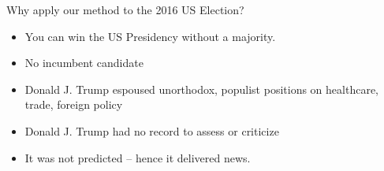 \documentclass[9pt]{beamer}
\theoremstyle{definition}
\begin{document}
    \begin{frame}{Why apply our method to the 2016 US Election?}
    
        \begin{itemize}
            \item You can win the US Presidency without a majority.
            \item No incumbent candidate
            \item Donald J. Trump espoused unorthodox, populist positions on healthcare, trade, foreign policy
            \item Donald J. Trump had no record to assess or criticize
            \item It was not predicted -- hence it delivered news.
        \end{itemize}
        
    \end{frame}
\end{document}
